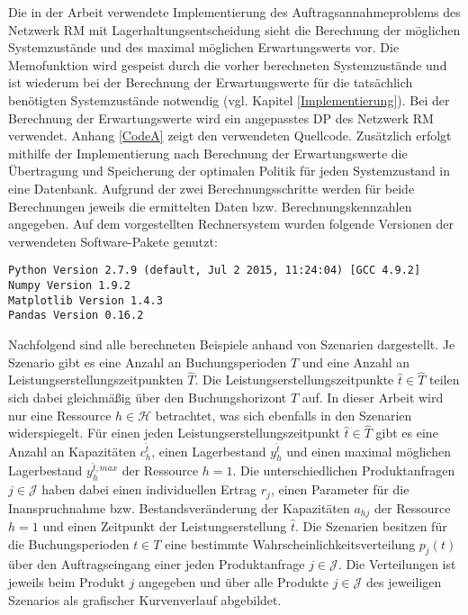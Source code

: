 Die in der Arbeit verwendete Implementierung des Auftragsannahmeproblems des Netzwerk RM mit Lagerhaltungsentscheidung sieht die Berechnung der möglichen Systemzustände und des maximal möglichen Erwartungswerts vor. Die Memofunktion wird gespeist durch die vorher berechneten Systemzustände und ist wiederum bei der Berechnung der Erwartungswerte für die tatsächlich benötigten Systemzustände notwendig (vgl. Kapitel \ref{Implementierung}). Bei der Berechnung der Erwartungswerte wird ein  angepasstes DP des Netzwerk RM verwendet. Anhang \ref{CodeA} zeigt den verwendeten Quellcode. Zusätzlich erfolgt mithilfe der Implementierung nach Berechnung der Erwartungswerte die Übertragung und Speicherung der optimalen Politik für jeden Systemzustand in eine Datenbank. Aufgrund der zwei Berechnungsschritte werden für beide Berechnungen jeweils die ermittelten Daten bzw. Berechnungskennzahlen angegeben.  Auf dem vorgestellten Rechnersystem wurden folgende Versionen der verwendeten Software-Pakete genutzt:

\colorbox{hellgrau}{\parbox{14cm}{\texttt{Python Version 2.7.9 (default, Jul  2 2015, 11:24:04) [GCC 4.9.2]\\
Numpy Version 1.9.2\\
Matplotlib Version 1.4.3\\
Pandas Version 0.16.2
}}}

Nachfolgend sind alle berechneten Beispiele anhand von Szenarien dargestellt. Je Szenario gibt es eine Anzahl an Buchungsperioden $T$ und eine Anzahl an Leistungserstellungszeitpunkten $\hat T$. Die Leistungserstellungszeitpunkte $\hat t \in \hat T$ teilen sich dabei gleichmäßig über den Buchungshorizont $T$ auf. In dieser Arbeit wird nur eine Ressource $h\in\mathcal{H}$ betrachtet, was sich ebenfalls in den Szenarien widerspiegelt. Für einen jeden Leistungserstellungszeitpunkt $\hat t \in \hat T$ gibt es eine Anzahl an Kapazitäten $c_h^{\hat t}$, einen Lagerbestand $y_h^{\hat t}$ und einen maximal möglichen Lagerbestand $y_h^{{\hat t},max}$ der Ressource $h=1$. Die unterschiedlichen Produktanfragen $j\in\mathcal{J}$ haben dabei einen individuellen Ertrag $r_j$, einen Parameter für die Inanspruchnahme bzw. Bestandsveränderung der Kapazitäten $a_{hj}$ der Ressource $h=1$ und einen Zeitpunkt der Leistungserstellung $\hat t$. Die Szenarien besitzen für die Buchungsperioden $t\in T$ eine bestimmte Wahrscheinlichkeitsverteilung $p_j(t)$ über den Auftragseingang einer jeden Produktanfrage $j\in\mathcal{J}$. Die Verteilungen ist jeweils beim Produkt $j$ angegeben und über alle Produkte $j\in\mathcal{J}$ des jeweiligen Szenarios als grafischer Kurvenverlauf abgebildet.

